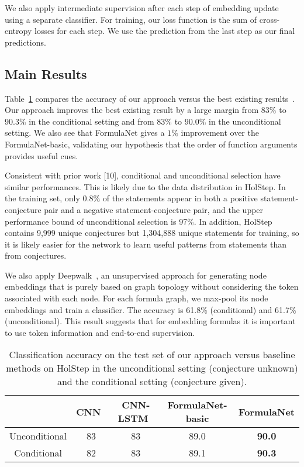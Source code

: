 \documentclass{article}
\begin{document}
We also apply intermediate supervision after each step of embedding update using a separate classifier. For training,
our loss function is the sum of cross-entropy losses for each step. We use the prediction
from the last step as our final predictions. 

\subsection{Main Results}

Table~\ref{tab:test} compares the accuracy of our approach versus  the best existing results~\cite{holstep}. Our approach improves the best existing result by a large margin from
$83\%$ to $90.3\%$ in the conditional setting and from $83\%$ to $90.0\%$ in the
unconditional setting. We also see that FormulaNet gives a $1\%$ improvement over the FormulaNet-basic, validating our hypothesis that the order of function arguments provides useful cues. 

Consistent with prior work [10], conditional and unconditional selection have similar
performances. This is likely due to the data distribution in HolStep. In the
training set, only 0.8\% of the statements appear in both a positive statement-conjecture
pair and a negative statement-conjecture pair, and the upper performance bound of unconditional selection is 97\%. In addition, HolStep
contains 9,999 unique conjectures but 1,304,888 unique statements for training, so it is
likely easier for the network to learn useful patterns from statements than from
conjectures. 


We also apply Deepwalk~\cite{perozzi2014deepwalk}, an unsupervised approach for
  generating node embeddings that is purely based on graph topology without considering
  the token associated with each node. For each formula graph, we max-pool its node embeddings and train a
  classifier. The accuracy is 61.8\% (conditional) and 61.7\%
  (unconditional). This result suggests that for embedding formulas it is important to use token information
  and end-to-end supervision. 

\begin{table}[t]
\caption{Classification accuracy on the test set of our approach versus baseline methods on HolStep in the unconditional setting
          (conjecture unknown) and the
          conditional setting (conjecture given). }
	\centering
	\begin{tabular}{c c c c c }\hline
	& CNN~\cite{holstep} & CNN-LSTM~\cite{holstep}  &FormulaNet-basic& FormulaNet \\ \hline
	Unconditional & 83 & 83 &  89.0 & \textbf{90.0} \\ 
	Conditional     & 82 & 83 &  89.1 & \textbf{90.3} \\ \hline
	\end{tabular}
    \label{tab:test}
    \vspace{-4mm}
\end{table}
\end{document}
